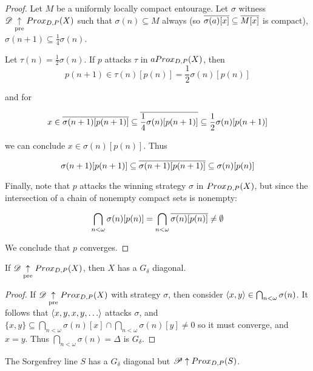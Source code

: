 \begin{proof}
  Let $M$ be a uniformly locally compact entourage. 
  Let $\sigma$ witness $\mathscr{D}\underset{\text{pre}}{\uparrow} Prox_{D,P}(X)$ such that 
  $\sigma(n)\subseteq M$ always 
  (so $\overline{\sigma(a)[x]}\subseteq\overline{M[x]}$ is compact), 
  $\sigma(n+1)\subseteq\frac{1}{4}\sigma(n)$.

  Let $\tau(n)=\frac{1}{2}\sigma(n)$. If $p$ attacks $\tau$ in 
  $aProx_{D,P}(X)$, then
    \[
      p(n+1)
        \in
      \tau(n)[p(n)]
        =
      \frac{1}{2}\sigma(n)[p(n)]
    \]

    and for

    \[
      x
        \in
      \overline{\sigma(n+1)[p(n+1)]}
        \subseteq
      \overline{\frac{1}{4}\sigma(n)[p(n+1)]}
        \subseteq
      \frac{1}{2}\sigma(n)[p(n+1)]
    \]

  we can conclude $x\in\sigma(n)[p(n)]$. Thus

    \[
      \sigma(n+1)[p(n+1)]
        \subseteq
      \overline{\sigma(n+1)[p(n+1)]}
        \subseteq
      \sigma(n)[p(n)]
    \]

  Finally, note that $p$ attacks the winning strategy $\sigma$ in 
  $Prox_{D,P}(X)$, but since the intersection of a chain of nonempty compact 
  sets is nonempty:

    \[
      \bigcap_{n<\omega} \sigma(n)[p(n)]
        =
      \bigcap_{n<\omega} \overline{\sigma(n)[p(n)]}
        \not=
      \emptyset
    \]

  We conclude that $p$ converges.
\end{proof}

\begin{proposition}
If $\mathscr{D} \underset{\text{pre}}{\uparrow} Prox_{D,P}(X)$, then $X$ has a $G_\delta$ diagonal.
\end{proposition}

\begin{proof}
  If $\mathscr{D} \underset{\text{pre}}{\uparrow} Prox_{D,P}(X)$ with strategy $\sigma$, then consider 
  $\langle x,y\rangle\in \bigcap_{n<\omega} \sigma(n)$. It follows that 
  $\<x,y,x,y,\dots\>$ attacks $\sigma$, and 
    $
      \{x,y\}\subseteq \bigcap_{n<\omega} 
      \sigma(n)[x]\cap\bigcap_{n<\omega}\sigma(n)[y]
      \not=0
    $ 
  so it must converge, and $x=y$. Thus
  $\bigcap_{n<\omega}\sigma(n) = \Delta$ is $G_\delta$.
\end{proof}

\begin{example}
The Sorgenfrey line $S$ has a $G_\delta$ diagonal but $\mathscr{P}\uparrow Prox_{D,P}(S)$.
\end{example}

